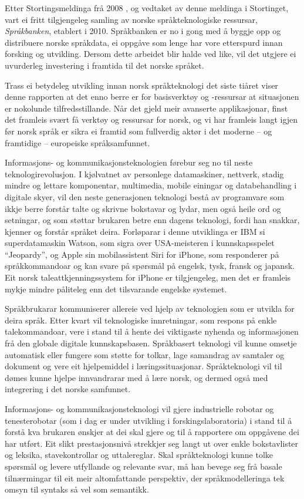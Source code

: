 \begin{multicols}{2}
Etter Stortingsmeldinga frå 2008 \cite{stm35:2008}, og vedtaket av
denne meldinga i Stortinget, vart ei fritt tilgjengeleg samling av
norske språkteknologiske ressursar, \emph{Språkbanken}, etablert i
2010. Språkbanken er no i gong med å byggje opp og distribuere norske
språkdata, ei oppgåve som lenge har vore etterspurd innan forsking og
utvikling. Dersom dette arbeidet blir halde ved like, vil det utgjere
ei uvurderleg investering i framtida til det norske språket.

Trass ei betydeleg utvikling innan norsk språkteknologi det siste tiåret viser denne rapporten at det enno berre er for basisverktøy og -ressursar at situasjonen er nokolunde tilfredsstillande. Når det gjeld meir avanserte applikasjonar, finst det framleis svært få verktøy og ressursar for norsk, og vi har framleis langt igjen før norsk språk er sikra ei framtid som fullverdig aktør i det moderne -- og framtidige -- europeiske språksamfunnet.   

Informasjons- og kommunikasjonsteknologien førebur seg no til neste teknologirevolusjon. I kjølvatnet av personlege datamaskiner, nettverk, stadig mindre og lettare komponentar, multimedia, mobile einingar og databehandling i digitale skyer, vil den neste generasjonen teknologi bestå av programvare som ikkje berre forstår talte og skrivne bokstavar og lydar, men også heile ord og setningar, og som støttar brukaren betre enn dagens teknologi, fordi han snakkar, kjenner og forstår språket deira. Forløparar i denne utviklinga er IBM si superdatamaskin Watson, som sigra over USA-meisteren i kunnskapsspelet “Jeopardy”, og Apple sin mobilassistent Siri for iPhone, som responderer på språkkommandoar og kan svare på spørsmål på engelsk, tysk, fransk og japansk. Eit norsk taleattkjenningssystem for iPhone er tilgjengeleg, men det er framleis mykje mindre påliteleg enn det tilsvarande engelske systemet. 

Språkbrukarar kommuniserer allereie ved hjelp av teknologien som er utvikla for deira språk. Etter kvart vil teknologiske innretningar, som respons på enkle talekommandoar, vere i stand til å hente dei viktigaste nyhenda og informasjonen frå den globale digitale kunnskapsbasen. Språkbasert teknologi vil kunne omsetje automatisk eller fungere som støtte for tolkar, lage samandrag av samtaler og dokument og vere eit hjelpemiddel i læringssituasjonar. Språkteknologi vil til dømes kunne hjelpe innvandrarar med å lære norsk, og dermed også med integrering i det norske samfunnet.        
 
Informasjons- og kommunikasjonsteknologi vil gjere industrielle
robotar og tenesterobotar (som i dag er under utvikling i
forskingslaboratoria) i stand til å forstå kva brukaren ønskjer at dei
skal gjere og til å rapportere om oppgåvene dei har utført. Eit slikt
prestasjonsnivå strekkjer seg langt ut over enkle bokstavlister og
leksika, stavekontrollar og uttalereglar. Skal språkteknologi kunne
tolke spørsmål og levere utfyllande og relevante svar, må han bevege
seg frå basale tilnærmingar til eit meir altomfattande perspektiv, der
språkmodelleringa tek omsyn til syntaks så vel som semantikk.  
\columnbreak


\end{multicols}
